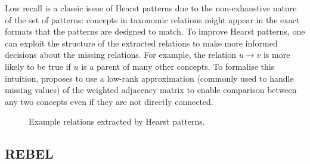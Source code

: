 Low recall is a classic issue of Hearst patterns due to the non-exhaustive nature of the set of patterns: concepts in taxonomic relations might appear in the exact formats that the patterns are designed to match. To improve Hearst patterns, one can exploit the structure of the extracted relations to make more informed decisions about the missing relations. For example, the relation $u \to v$ is more likely to be true if $u$ is a parent of many other concepts. To formalise this intuition, \citet{roller2018hearst} proposes to use a low-rank approximation \cite{schmidt1907theorie} (commonly used to handle missing values) of the weighted adjacency matrix to enable comparison between any two concepts even if they are not directly connected. 

\begin{figure}
    \centering
    \caption{Example relations extracted by Hearst patterns.}
    \label{fig:hearst-example}
\end{figure}

\subsection{REBEL}

